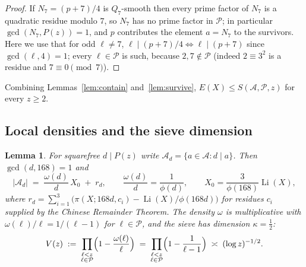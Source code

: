 \documentclass[12pt]{amsart}
\newtheorem{lemma}[theorem]{Lemma}
\theoremstyle{definition}
\theoremstyle{remark}
\begin{document}
\begin{proof}
If $N_7 = (p+7)/4$ is $Q_7$-smooth then every prime factor of $N_7$ is a
quadratic residue modulo $7$, so $N_7$ has no prime factor in
$\mathcal{P}$; in particular $\gcd(N_7, P(z)) = 1$, and $p$ contributes
the element $a = N_7$ to the survivors. Here we use that for odd
$\ell \ne 7$, $\ell \mid (p+7)/4 \iff \ell \mid (p+7)$ since
$\gcd(\ell, 4) = 1$; every $\ell \in \mathcal{P}$ is such, because
$2, 7 \notin \mathcal{P}$ (indeed $2 \equiv 3^2$ is a residue and
$7 \equiv 0 \pmod 7$).
\end{proof}

Combining Lemmas~\ref{lem:contain} and~\ref{lem:survive},
$E(X) \le S(\mathcal{A}, \mathcal{P}, z)$ for every $z \ge 2$.

\subsection{Local densities and the sieve dimension}

\begin{lemma}\label{lem:local}
For squarefree $d \mid P(z)$ write
$\mathcal{A}_d = \{a \in \mathcal{A} : d \mid a\}$.
Then $\gcd(d, 168) = 1$ and
\[
  |\mathcal{A}_d| \;=\; \frac{\omega(d)}{d}\, X_0 \;+\; r_d,
  \qquad
  \frac{\omega(d)}{d} = \frac{1}{\phi(d)},
  \qquad
  X_0 = \frac{3}{\phi(168)} \operatorname{Li}(X),
\]
where
$r_d = \sum_{i=1}^{3}\bigl(\pi(X; 168d, c_i)
- \operatorname{Li}(X)/\phi(168d)\bigr)$
for residues $c_i$ supplied by the Chinese Remainder Theorem.
The density $\omega$ is multiplicative with
$\omega(\ell)/\ell = 1/(\ell-1)$ for $\ell \in \mathcal{P}$, and the
sieve has dimension $\kappa = \tfrac12$:
\[
  V(z) \;:=\; \prod_{\substack{\ell < z \\ \ell \in \mathcal{P}}}
  \Bigl(1 - \frac{\omega(\ell)}{\ell}\Bigr)
  \;=\; \prod_{\substack{\ell < z \\ \ell \in \mathcal{P}}}
  \Bigl(1 - \frac{1}{\ell-1}\Bigr)
  \;\asymp\; (\log z)^{-1/2}.
\]
\end{lemma}
\end{document}
